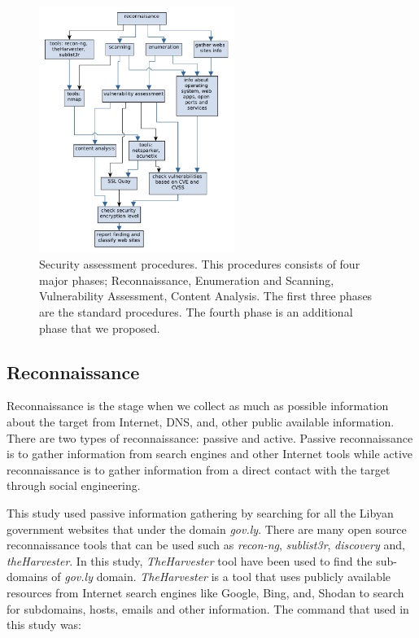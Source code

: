\documentclass[conference,letterpaper]{IEEEtran}
\begin{document}
\begin{figure}[htbp]
	\centerline{\includegraphics[width=2.5in]{steps.pdf}}
	\caption{Security assessment procedures. This procedures
          consists of four major phases; Reconnaissance, Enumeration
          and Scanning, Vulnerability Assessment, Content
          Analysis. The first three phases are the standard
          procedures. The fourth phase is an additional phase that we
          proposed.}
	\label{fig:steps}
\end{figure}

\subsection{Reconnaissance}

Reconnaissance is the stage when we collect as much as possible
information about the target from Internet, DNS, and, other public
available information.  There are two types of reconnaissance: passive
and active. Passive reconnaissance is to gather information from
search engines and other Internet tools while active reconnaissance is
to gather information from a direct contact with the target through
social engineering.

This study used passive information gathering by searching for all the
Libyan government websites that under the domain \emph{gov.ly}. There
are many open source reconnaissance tools that can be used such as
\emph{recon-ng}, \emph{sublist3r}, \emph{discovery} and,
\emph{theHarvester}\cite{buchanan2017kali}.  In this study,
\emph{TheHarvester} tool have been used to find the sub- domains of
\emph{gov.ly} domain. \emph{TheHarvester} is a tool that uses publicly
available resources from Internet search engines like Google, Bing,
and, Shodan to search for subdomains, hosts, emails and other
information. The command that used in this study was:
\end{document}
